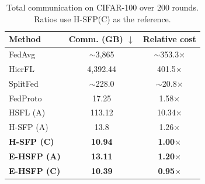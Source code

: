 \clearpage
\raggedbottom
\begin{table}[H]
\centering
\caption{Total communication on CIFAR-100 over 200 rounds. Ratios use H-SFP(C) as the reference.}
\label{tab:comm_memory}
\begin{tabular}{@{}lcc@{}}
\toprule
Method & Comm. (GB) $\downarrow$ & Relative cost \\
\midrule
FedAvg & $\sim$3,865 & $\sim$353.3$\times$ \\
HierFL & 4,392.44 & 401.5$\times$ \\
SplitFed & $\sim$228.0 & $\sim$20.8$\times$ \\
FedProto & 17.25 & 1.58$\times$ \\
HSFL (A) & 113.12 & 10.34$\times$ \\
H-SFP (A) & 13.8 & 1.26$\times$ \\
\textbf{H-SFP (C)} & \textbf{10.94} & \textbf{1.00$\times$} \\
\textbf{E-HSFP (A)} & \textbf{13.11} & \textbf{1.20$\times$} \\
\textbf{E-HSFP (C)} & \textbf{10.39} & \textbf{0.95$\times$} \\
\bottomrule
\end{tabular}
\end{table}

